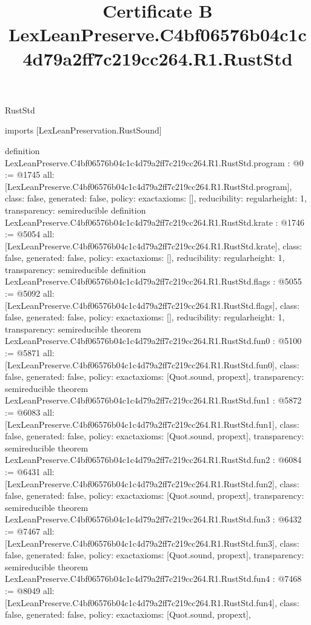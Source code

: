 \begin{lexlean}{RustStd}
\title{Certificate B LexLeanPreserve.C4bf06576b04c1c4d79a2ff7c219cc264.R1.RustStd}
\begin{coremodule}
imports [LexLeanPreservation.RustSound]

definition LexLeanPreserve.C4bf06576b04c1c4d79a2ff7c219cc264.R1.RustStd.program : @0 := @1745 {
  all: [LexLeanPreserve.C4bf06576b04c1c4d79a2ff7c219cc264.R1.RustStd.program],
  class: false,
  generated: false,
  policy: exact{axioms: []},
  reducibility: regular{height: 1},
  transparency: semireducible
}
definition LexLeanPreserve.C4bf06576b04c1c4d79a2ff7c219cc264.R1.RustStd.krate : @1746 := @5054 {
  all: [LexLeanPreserve.C4bf06576b04c1c4d79a2ff7c219cc264.R1.RustStd.krate],
  class: false,
  generated: false,
  policy: exact{axioms: []},
  reducibility: regular{height: 1},
  transparency: semireducible
}
definition LexLeanPreserve.C4bf06576b04c1c4d79a2ff7c219cc264.R1.RustStd.flags : @5055 := @5092 {
  all: [LexLeanPreserve.C4bf06576b04c1c4d79a2ff7c219cc264.R1.RustStd.flags],
  class: false,
  generated: false,
  policy: exact{axioms: []},
  reducibility: regular{height: 1},
  transparency: semireducible
}
theorem LexLeanPreserve.C4bf06576b04c1c4d79a2ff7c219cc264.R1.RustStd.fun0 : @5100 := @5871 {
  all: [LexLeanPreserve.C4bf06576b04c1c4d79a2ff7c219cc264.R1.RustStd.fun0],
  class: false,
  generated: false,
  policy: exact{axioms: [Quot.sound, propext]},
  transparency: semireducible
}
theorem LexLeanPreserve.C4bf06576b04c1c4d79a2ff7c219cc264.R1.RustStd.fun1 : @5872 := @6083 {
  all: [LexLeanPreserve.C4bf06576b04c1c4d79a2ff7c219cc264.R1.RustStd.fun1],
  class: false,
  generated: false,
  policy: exact{axioms: [Quot.sound, propext]},
  transparency: semireducible
}
theorem LexLeanPreserve.C4bf06576b04c1c4d79a2ff7c219cc264.R1.RustStd.fun2 : @6084 := @6431 {
  all: [LexLeanPreserve.C4bf06576b04c1c4d79a2ff7c219cc264.R1.RustStd.fun2],
  class: false,
  generated: false,
  policy: exact{axioms: [Quot.sound, propext]},
  transparency: semireducible
}
theorem LexLeanPreserve.C4bf06576b04c1c4d79a2ff7c219cc264.R1.RustStd.fun3 : @6432 := @7467 {
  all: [LexLeanPreserve.C4bf06576b04c1c4d79a2ff7c219cc264.R1.RustStd.fun3],
  class: false,
  generated: false,
  policy: exact{axioms: [Quot.sound, propext]},
  transparency: semireducible
}
theorem LexLeanPreserve.C4bf06576b04c1c4d79a2ff7c219cc264.R1.RustStd.fun4 : @7468 := @8049 {
  all: [LexLeanPreserve.C4bf06576b04c1c4d79a2ff7c219cc264.R1.RustStd.fun4],
  class: false,
  generated: false,
  policy: exact{axioms: [Quot.sound, propext]},
}
\end{coremodule}
\end{lexlean}
